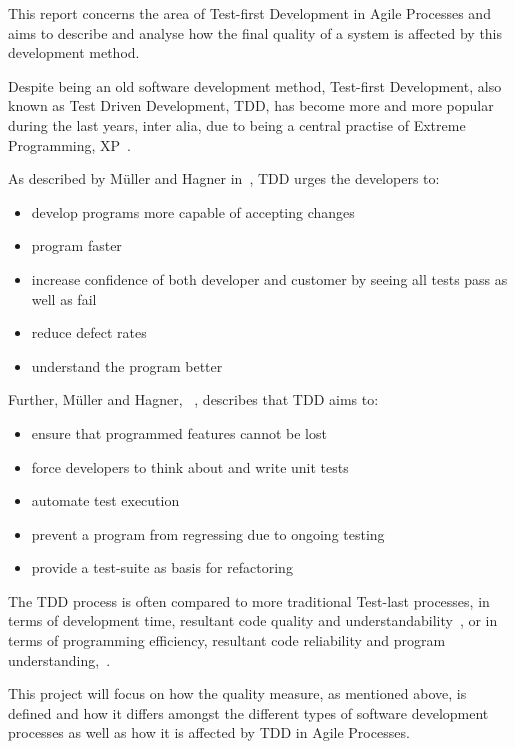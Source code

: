 

This report concerns the area of Test-first Development in Agile Processes and aims to describe and analyse how the final quality of a system is affected by this development method. 

Despite being an old software development method, Test-first Development, also known as Test Driven Development, TDD, has become more and more popular during the last years, inter alia, due to being a central practise of Extreme Programming, XP~\cite{georgeandwilliams}. 

As described by M\"{u}ller and Hagner in~\cite{mullerandhagner}, TDD urges the developers to:
\begin{itemize}
\item	develop programs more capable of accepting changes
\item 	program faster
\item	increase confidence of both developer and customer by seeing all tests pass as well as fail
\item 	reduce defect rates 
\item	understand the program better
\end{itemize}

\noindent Further, M\"{u}ller and Hagner, ~\cite{mullerandhagner}, describes that TDD aims to:
\begin{itemize}
\item 	ensure that programmed features cannot be lost
\item 	force developers to think about and write unit tests 
\item	automate test execution
\item	prevent a program from regressing due to ongoing testing
\item 	provide a test-suite as basis for refactoring
\end{itemize}

\noindent The TDD process is often compared to more traditional Test-last processes, in terms of development time, resultant code quality and understandability~\cite{georgeandwilliams}, or in terms of programming efficiency, resultant code reliability and program understanding,~\cite{mullerandhagner}. 

This project will focus on how the quality measure, as mentioned above, is defined and how it differs amongst the different types of software development processes as well as how it is affected by TDD in Agile Processes. 